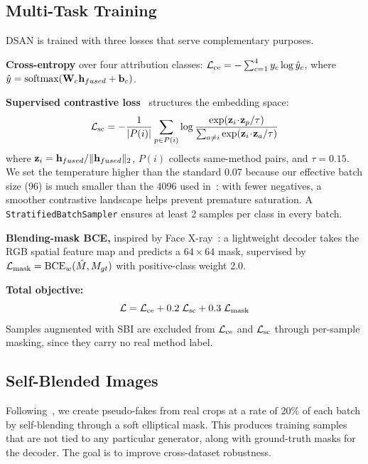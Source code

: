 \subsection{Multi-Task Training}

DSAN is trained with three losses that serve complementary purposes.

\textbf{Cross-entropy} over four attribution classes: $\mathcal{L}_{\text{ce}} = -\sum_{c=1}^{4} y_c \log \hat{y}_c$, where $\hat{y} = \text{softmax}(\mathbf{W}_c \mathbf{h}_{fused} + \mathbf{b}_c)$.

\textbf{Supervised contrastive loss}~\cite{khosla2020supervised} structures the embedding space:
\begin{equation}
    \mathcal{L}_{\text{sc}} = -\frac{1}{|P(i)|} \sum_{p \in P(i)} \log \frac{\exp(\mathbf{z}_i \!\cdot\! \mathbf{z}_p / \tau)}{\sum_{a \neq i} \exp(\mathbf{z}_i \!\cdot\! \mathbf{z}_a / \tau)}
    \label{eq:supcon}
\end{equation}
where $\mathbf{z}_i = \mathbf{h}_{fused}/\|\mathbf{h}_{fused}\|_2$, $P(i)$ collects same-method pairs, and $\tau = 0.15$. We set the temperature higher than the standard 0.07 because our effective batch size (96) is much smaller than the 4096 used in~\cite{khosla2020supervised}: with fewer negatives, a smoother contrastive landscape helps prevent premature saturation. A \texttt{StratifiedBatchSampler} ensures at least 2 samples per class in every batch.

\textbf{Blending-mask BCE,} inspired by Face X-ray~\cite{li2020facexray}: a lightweight decoder takes the RGB spatial feature map and predicts a $64\!\times\!64$ mask, supervised by $\mathcal{L}_{\text{mask}} = \text{BCE}_w(\hat{M}, M_{gt})$ with positive-class weight 2.0.

\textbf{Total objective:}
\begin{equation}
    \mathcal{L} = \mathcal{L}_{\text{ce}} + 0.2\;\mathcal{L}_{\text{sc}} + 0.3\;\mathcal{L}_{\text{mask}}
    \label{eq:total}
\end{equation}
Samples augmented with SBI are excluded from $\mathcal{L}_{\text{ce}}$ and $\mathcal{L}_{\text{sc}}$ through per-sample masking, since they carry no real method label.

\subsection{Self-Blended Images}
Following~\cite{shiohara2022sbi}, we create pseudo-fakes from real crops at a rate of 20\% of each batch by self-blending through a soft elliptical mask. This produces training samples that are not tied to any particular generator, along with ground-truth masks for the decoder. The goal is to improve cross-dataset robustness.

